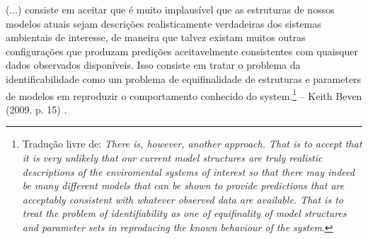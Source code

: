 \documentclass[./main.tex]{subfiles}
\begin{document}
\begin{adjustwidth}{100pt}{0pt}
\medskip
\small (...) consiste em aceitar que é muito implausível que as estruturas de nossos modelos atuais sejam descrições realisticamente verdadeiras dos sistemas ambientais de interesse, de maneira que talvez existam muitos outras configurações que produzam predições aceitavelmente consistentes com quaisquer dados observados disponíveis. Isso consiste em tratar o problema da identificabilidade como um problema de equifinalidade de estruturas e \gls{parameters} de modelos em reproduzir o comportamento conhecido do \gls{system}.\footnote{Tradução livre de: \textit{There is, however, another approach. That is to accept that it is very unlikely that our current model structures are truly realistic descriptions of the enviromental systems of interest so that there may indeed be many different models that can be shown to provide predictions that are acceptably consistent with whatever observed data are available. That is to treat the problem of identifiability as one of equifinality of model structures and parameter sets in reproducing the known behaviour of the system}.} -- Keith Beven (2009. p. 15) \cite{Beven2009}.
\medskip
\end{adjustwidth}
\end{document}
